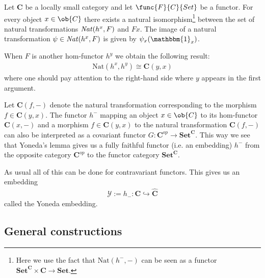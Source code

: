     \begin{theorem}
        Let $\mathbf{C}$ be a locally small category and let $\func{F}{C}{Set}$ be a functor. For every object $x\in\ob{C}$ there exists a natural isomorphism\footnote{Here we use the fact that $\text{Nat}(h^-, -)$ can be seen as a functor $\mathbf{Set}^{\mathbf{C}}\times\mathbf{C}\rightarrow\mathbf{Set}$.} between the set of natural transformations $\text{\emph{Nat}}(h^x, F)$ and $Fx$. The image of a natural transformation $\psi\in\text{\emph{Nat}}(h^x, F)$ is given by $\psi_x(\mathbbm{1}_x)$.
    \end{theorem}

    \begin{result}
        When $F$ is another hom-functor $h^y$ we obtain the following result:
        \begin{gather}
            \text{Nat}(h^x, h^y)\cong\mathbf{C}(y, x)
        \end{gather}
        where one should pay attention to the right-hand side where $y$ appears in the first argument.

        Let $\mathbf{C}(f, -)$ denote the natural transformation corresponding to the morphism $f\in\mathbf{C}(y,x)$. The functor $h^-$ mapping an object $x\in\ob{C}$ to its hom-functor $\mathbf{C}(x, -)$ and a morphism $f\in\mathbf{C}(y, x)$ to the natural transformation $\mathbf{C}(f, -)$ can also be interpreted as a covariant functor $G:\mathbf{C}^{op}\rightarrow\mathbf{Set}^{\mathbf{C}}$. This way we see that Yoneda's lemma gives us a fully faithful functor (i.e. an embedding) $h^-$ from the opposite category $\mathbf{C}^{op}$ to the functor category $\mathbf{Set}^{\mathbf{C}}$.

        As usual all of this can be done for contravariant functors. This gives us an embedding
        \begin{gather}
            \mathcal{Y}:=h_-:\mathbf{C}\hookrightarrow\widehat{\mathbf{C}}
        \end{gather}
        called the Yoneda embedding.
    \end{result}

\subsection{General constructions}


